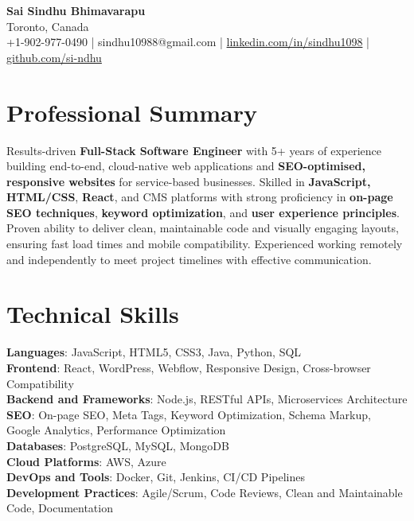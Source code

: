 \documentclass[letterpaper,11pt]{article}
\begin{document}
\begin{center}
  {\Large \textbf{Sai Sindhu Bhimavarapu}} \\
  Toronto, Canada \\
  +1-902-977-0490 \enspace | \enspace sindhu10988@gmail.com \enspace | \enspace \href{https://www.linkedin.com/in/sindhu1098/}{linkedin.com/in/sindhu1098} \enspace | \enspace \href{https://github.com/si-ndhu}{github.com/si-ndhu}
\end{center}

\section{Professional Summary}
  \begin{itemize}[leftmargin=0.15in, label={}]
    \small{\item{
     Results-driven \textbf{Full-Stack Software Engineer} with 5+ years of experience building end-to-end, cloud-native web applications and \textbf{SEO-optimised, responsive websites} for service-based businesses. Skilled in \textbf{JavaScript, HTML/CSS}, \textbf{React}, and CMS platforms with strong proficiency in \textbf{on-page SEO techniques}, \textbf{keyword optimization}, and \textbf{user experience principles}. Proven ability to deliver clean, maintainable code and visually engaging layouts, ensuring fast load times and mobile compatibility. Experienced working remotely and independently to meet project timelines with effective communication.
    }}
  \end{itemize}
\vspace{-16pt}

\section{Technical Skills}
 \begin{itemize}[leftmargin=0.15in, label={}]
    \small{\item{
     \textbf{Languages}: JavaScript, HTML5, CSS3, Java, Python, SQL \\
     \textbf{Frontend}: React, WordPress, Webflow, Responsive Design, Cross-browser Compatibility \\
     \textbf{Backend and Frameworks}: Node.js, RESTful APIs, Microservices Architecture \\
     \textbf{SEO}: On-page SEO, Meta Tags, Keyword Optimization, Schema Markup, Google Analytics, Performance Optimization \\
     \textbf{Databases}: PostgreSQL, MySQL, MongoDB \\
     \textbf{Cloud Platforms}: AWS, Azure \\
     \textbf{DevOps and Tools}: Docker, Git, Jenkins, CI/CD Pipelines \\
     \textbf{Development Practices}: Agile/Scrum, Code Reviews, Clean and Maintainable Code, Documentation
    }}
 \end{itemize}
\vspace{-16pt}
\end{document}
